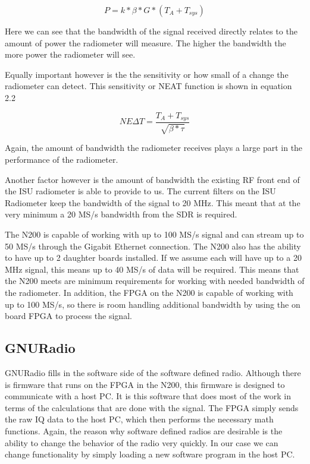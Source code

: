 \begin{equation}
P=k*\beta*G*(T_{A}+T_{sys})
\end{equation}

Here we can see that the bandwidth of the signal received directly relates to the amount of power the radiometer will measure.  The higher the bandwidth the more power the radiometer will see.  

Equally important however is the the sensitivity or how small of a change the radiometer can detect.  This sensitivity or NEAT function is shown in equation 2.2

\begin{equation}
NE\Delta T=\frac{T_{A}+T_{sys}}{\sqrt{\beta * \tau}}
\end{equation}

Again, the amount of bandwidth the radiometer receives plays a large part in the performance of the radiometer.  

Another factor however is the amount of bandwidth the existing RF front end of the ISU radiometer is able to provide to us.  The current filters on the ISU Radiometer keep the bandwidth of the signal to 20 MHz.  This meant that at the very minimum a 20 MS/s bandwidth from the SDR is required.  

The N200 is capable of working with up to 100 MS/s signal and can stream up to 50 MS/s through the Gigabit Ethernet connection.  The N200 also has the ability to have up to 2 daughter boards installed.  If we assume each will have up to a 20 MHz signal, this means up to 40 MS/s of data will be required.  This means that the N200 meets are minimum requirements for working with needed bandwidth of the radiometer.  In addition, the FPGA on the N200 is capable of working with up to 100 MS/s, so there is room handling additional bandwidth by using the on board FPGA to process the signal.

\subsection{GNURadio}

GNURadio fills in the software side of the software defined radio.  Although there is firmware that runs on the FPGA in the N200, this firmware is designed to communicate with a host PC.  It is this software that does most of the work in terms of the calculations that are done with the signal.  The FPGA simply sends the raw IQ data to the host PC, which then performs the necessary math functions.  Again, the reason why software defined radios are desirable is the ability to change the behavior of the radio very quickly.  In our case we can change functionality by simply loading a new software program in the host PC.  

